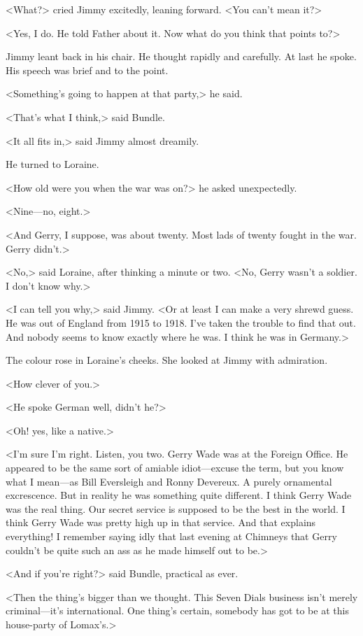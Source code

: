 <What?> cried Jimmy excitedly, leaning forward. <You can't mean it?>

<Yes, I do. He told Father about it. Now what do you think that points to?>

Jimmy leant back in his chair. He thought rapidly and carefully. At last he spoke. His speech was brief and to the point.

<Something's going to happen at that party,> he said.

<That's what I think,> said Bundle.

<It all fits in,> said Jimmy almost dreamily.

He turned to Loraine.

<How old were you when the war was on?> he asked unexpectedly.

<Nine—no, eight.>

<And Gerry, I suppose, was about twenty. Most lads of twenty fought in the war. Gerry didn't.>

<No,> said Loraine, after thinking a minute or two. <No, Gerry wasn't a soldier. I don't know why.>

<I can tell you why,> said Jimmy. <Or at least I can make a very shrewd guess. He was out of England from 1915 to 1918. I've taken the trouble to find that out. And nobody seems to know exactly where he was. I think he was in Germany.>

The colour rose in Loraine's cheeks. She looked at Jimmy with admiration.

<How clever of you.>

<He spoke German well, didn't he?>

<Oh! yes, like a native.>

<I'm sure I'm right. Listen, you two. Gerry Wade was at the Foreign Office. He appeared to be the same sort of amiable idiot—excuse the term, but you know what I mean—as Bill Eversleigh and Ronny Devereux. A purely ornamental excrescence. But in reality he was something quite different. I think Gerry Wade was the real thing. Our secret service is supposed to be the best in the world. I think Gerry Wade was pretty high up in that service. And that explains everything! I remember saying idly that last evening at Chimneys that Gerry couldn't be quite such an ass as he made himself out to be.>

<And if you're right?> said Bundle, practical as ever.

<Then the thing's bigger than we thought. This Seven Dials business isn't merely criminal—it's international. One thing's certain, somebody has got to be at this house-party of Lomax's.>

